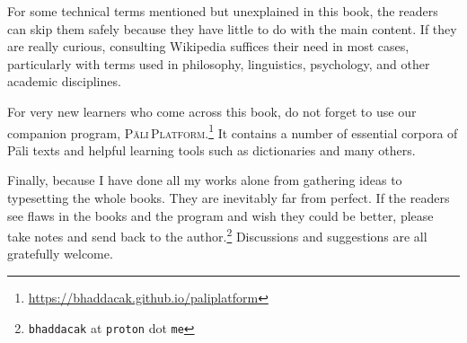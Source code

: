 For some technical terms mentioned but unexplained in this book, the readers can skip them safely because they have little to do with the main content. If they are really curious, consulting Wikipedia suffices their need in most cases, particularly with terms used in philosophy, linguistics, psychology, and other academic disciplines.

For very new learners who come across this book, do not forget to use our companion program, \textsc{P\=ali\,Platform}.\footnote{\url{https://bhaddacak.github.io/paliplatform}} It contains a number of essential corpora of P\=ali texts and helpful learning tools such as dictionaries and many others.

Finally, because I have done all my works alone from gathering ideas to typesetting the whole books. They are inevitably far from perfect. If the readers see flaws in the books and the program and wish they could be better, please take notes and send back to the author.\footnote{\texttt{bhaddacak} at \texttt{proton} dot \texttt{me}} Discussions and suggestions are all gratefully welcome.
